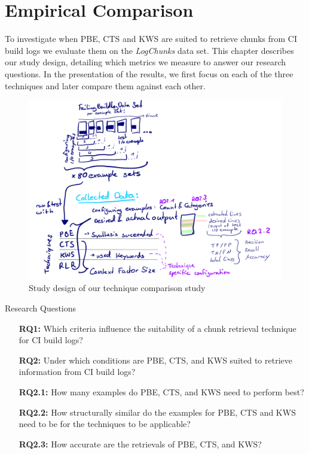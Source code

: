 \documentclass[\myrootdir/main.tex]{subfiles}
\begin{document}
\chapter{Empirical Comparison}
\label{sec:study}
To investigate when PBE, CTS and KWS are suited to retrieve chunks from CI build logs we evaluate them on the \emph{LogChunks} data set.
This chapter describes our study design, detailing which metrics we measure to answer our research questions.
In the presentation of the results, we first focus on each of the three techniques and later compare them against each other.


\begin{figure}[htbp]
	\centering
	\includegraphics[width=\textwidth, clip]{img/study-design.pdf}
	\caption{Study design of our technique comparison study}
	\label{fig:study}
\end{figure}


\begin{simplebox}{Research Questions}
\begin{itemize}
  \item[\textbf{RQ1:}] Which criteria influence the suitability of a chunk retrieval technique for CI build logs?
  \item[\textbf{RQ2:}] Under which conditions are PBE, CTS, and KWS suited to retrieve information from CI build logs?
  \item[\textbf{RQ2.1:}] How many examples do PBE, CTS, and KWS need to perform best?
  \item[\textbf{RQ2.2:}] How structurally similar do the examples for PBE, CTS and KWS need to be for the techniques to be applicable?
  \item[\textbf{RQ2.3:}] How accurate are the retrievals of PBE, CTS, and KWS?
\end{itemize}
\end{simplebox}
\end{document}
